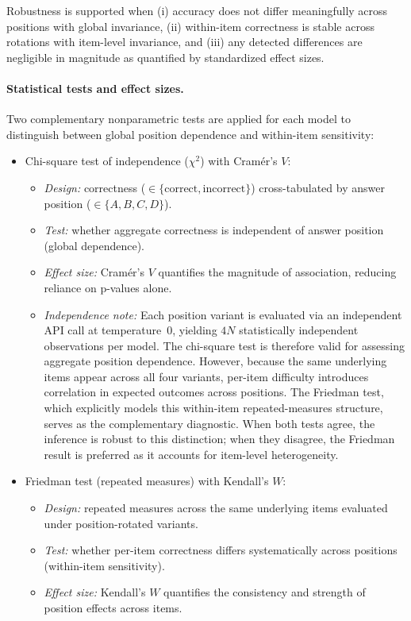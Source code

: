 Robustness is supported when (i) accuracy does not differ meaningfully across positions with global invariance, (ii) within-item correctness is stable across rotations with item-level invariance, and (iii) any detected differences are negligible in magnitude as quantified by standardized effect sizes.


\paragraph{Statistical tests and effect sizes.}
Two complementary nonparametric tests are applied for each model to distinguish between global position dependence and within-item sensitivity:

\begin{itemize}[leftmargin=*, itemsep=0.5em]
\item Chi-square test of independence ($\chi^2$) with Cram\'{e}r's $V$:
  \begin{itemize}[leftmargin=*, itemsep=0.25em]
    \item \emph{Design:} correctness ($\in\{\text{correct},\text{incorrect}\}$) cross-tabulated by answer position ($\in\{A,B,C,D\}$).
    \item \emph{Test:} whether aggregate correctness is independent of answer position (global dependence).
    \item \emph{Effect size:} Cram\'{e}r's $V$ quantifies the magnitude of association, reducing reliance on p-values alone.
    \item \emph{Independence note:} Each position variant is evaluated via an independent API call at temperature~0, yielding $4N$ statistically independent observations per model. The chi-square test is therefore valid for assessing aggregate position dependence. However, because the same underlying items appear across all four variants, per-item difficulty introduces correlation in expected outcomes across positions. The Friedman test, which explicitly models this within-item repeated-measures structure, serves as the complementary diagnostic. When both tests agree, the inference is robust to this distinction; when they disagree, the Friedman result is preferred as it accounts for item-level heterogeneity.
  \end{itemize}

\item Friedman test (repeated measures) with Kendall's $W$:
  \begin{itemize}[leftmargin=*, itemsep=0.25em]
    \item \emph{Design:} repeated measures across the same underlying items evaluated under position-rotated variants.
    \item \emph{Test:} whether per-item correctness differs systematically across positions (within-item sensitivity).
    \item \emph{Effect size:} Kendall's $W$ quantifies the consistency and strength of position effects across items.
  \end{itemize}
\end{itemize}


